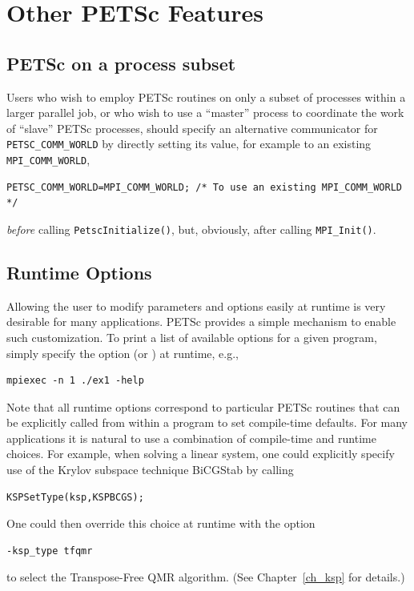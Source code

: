 {{%
\cleardoublepage
\chapter{Other PETSc Features}

\section{PETSc on a process subset}

Users who wish to employ PETSc routines on only a subset
of processes within a larger parallel job, or who wish to use a
``master'' process to coordinate the work of ``slave'' PETSc
processes, should specify an alternative communicator for \lstinline{PETSC_COMM_WORLD} by directly setting its value, for example to an existing \lstinline{MPI_COMM_WORLD},
\begin{lstlisting}
PETSC_COMM_WORLD=MPI_COMM_WORLD; /* To use an existing MPI_COMM_WORLD */
\end{lstlisting}
{\em before} calling \lstinline{PetscInitialize()}, but, obviously, after
calling \lstinline{MPI_Init()}.

\section{Runtime Options}  
\label{sec_options}

Allowing the user to modify parameters and options easily at runtime
is very desirable for many applications.  PETSc provides a simple
mechanism to enable such customization.  To print a list of
available options for a given program, simply specify the option
 (or ) at runtime, e.g.,  
\begin{lstlisting}
mpiexec -n 1 ./ex1 -help
\end{lstlisting}

Note that all runtime options correspond to particular PETSc routines
that can be explicitly called from within a program to set compile-time
defaults.   For many applications it is natural to use a combination
of compile-time and runtime choices.  For example, when solving a linear
system, one could explicitly specify use of the Krylov subspace
technique BiCGStab by calling
\begin{lstlisting}
KSPSetType(ksp,KSPBCGS);
\end{lstlisting}
One could then override this choice at runtime with the option
\begin{lstlisting}
-ksp_type tfqmr
\end{lstlisting}
to select the Transpose-Free QMR algorithm. (See Chapter~\ref{ch_ksp} for details.)

}}
